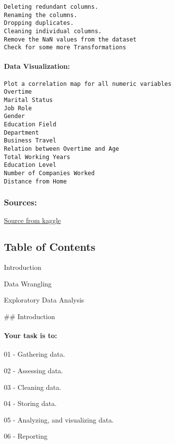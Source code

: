 \documentclass[11pt]{article}
\begin{document}
\begin{verbatim}
Deleting redundant columns.
Renaming the columns.
Dropping duplicates.
Cleaning individual columns.
Remove the NaN values from the dataset
Check for some more Transformations
\end{verbatim}

\hypertarget{data-visualization}{%
\paragraph{Data Visualization:}\label{data-visualization}}

\begin{verbatim}
Plot a correlation map for all numeric variables
Overtime
Marital Status
Job Role
Gender
Education Field
Department
Business Travel
Relation between Overtime and Age
Total Working Years
Education Level
Number of Companies Worked
Distance from Home
\end{verbatim}

\hypertarget{sources}{%
\subsubsection{Sources:}\label{sources}}

\href{https://www.kaggle.com/search?q=HR-Employee-Attrition+in\%3Adatasets}{Source
from kaggle}

    \hypertarget{table-of-contents}{%
\subsection{Table of Contents}\label{table-of-contents}}

Introduction

Data Wrangling

Exploratory Data Analysis

    \#\# Introduction

    \hypertarget{your-task-is-to}{%
\paragraph{Your task is to:}\label{your-task-is-to}}

01 - Gathering data.

02 - Assessing data.

03 - Cleaning data.

04 - Storing data.

05 - Analyzing, and visualizing data.

06 - Reporting
\end{document}
